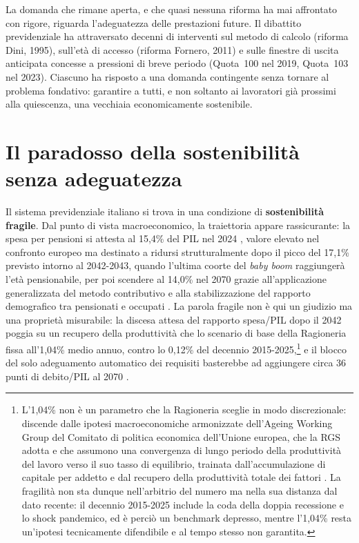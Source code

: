 La domanda che rimane aperta, e che quasi nessuna riforma ha mai affrontato
con rigore, riguarda l'adeguatezza delle prestazioni future. Il dibattito
previdenziale ha attraversato decenni di interventi sul metodo di calcolo
(riforma Dini, 1995), sull'età di accesso (riforma Fornero, 2011) e sulle
finestre di uscita anticipata concesse a pressioni di breve periodo (Quota~100
nel 2019, Quota~103 nel 2023). Ciascuno ha risposto a una domanda contingente
senza tornare al problema fondativo: garantire a tutti, e non soltanto ai
lavoratori già prossimi alla quiescenza, una vecchiaia economicamente
sostenibile.

\section*{Il paradosso della sostenibilità senza adeguatezza}

Il sistema previdenziale italiano si trova in una condizione di
\textbf{sostenibilità fragile}. Dal punto di vista macroeconomico, la traiettoria
appare rassicurante: la spesa per pensioni si attesta al 15,4\% del PIL nel 2024
\cite{MEF_RGS2025}, valore elevato nel confronto europeo ma destinato a ridursi
strutturalmente dopo il picco del 17,1\% previsto intorno al 2042-2043, quando
l'ultima coorte del \emph{baby boom} raggiungerà l'età pensionabile, per poi
scendere al 14,0\% nel 2070 grazie
all'applicazione generalizzata del metodo contributivo e alla stabilizzazione del
rapporto demografico tra pensionati e occupati \cite{MEF_RGS2025_NdA}. La parola
fragile non è qui un giudizio ma una proprietà misurabile: la discesa attesa del
rapporto spesa/PIL dopo il 2042 poggia su un recupero della produttività che lo
scenario di base della Ragioneria fissa all'1,04\%
medio annuo, contro lo 0,12\% del decennio 2015-2025,\footnote{L'1,04\% non è un
parametro che la Ragioneria sceglie in modo discrezionale: discende dalle ipotesi
macroeconomiche armonizzate dell'Ageing Working Group del Comitato di politica
economica dell'Unione europea, che la RGS adotta e che assumono una convergenza di
lungo periodo della produttività del lavoro verso il suo tasso di equilibrio,
trainata dall'accumulazione di capitale per addetto e dal recupero della
produttività totale dei fattori \cite{MEF_RGS2025}. La fragilità non sta dunque
nell'arbitrio del numero ma nella sua distanza dal dato recente: il decennio
2015-2025 include la coda della doppia recessione e lo shock pandemico, ed è
perciò un benchmark depresso, mentre l'1,04\% resta un'ipotesi tecnicamente
difendibile e al tempo stesso non garantita.} e il blocco del solo
adeguamento automatico dei requisiti basterebbe ad aggiungere circa 36 punti di
debito/PIL al 2070 \cite{OCPI2026, MEF_RGS2025_NdA}.


